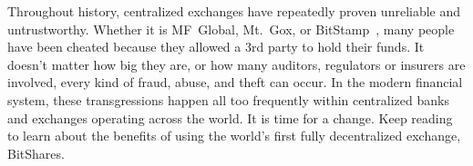 \label{sec:dex}

Throughout history, centralized exchanges have repeatedly proven unreliable and
untrustworthy. Whether it is MF~Global, Mt.~Gox, or
BitStamp~\cite{mfglobal,mtgox,bitstamp}, many people have been cheated because
they allowed a 3rd party to hold their funds. It doesn't matter how big they
are, or how many auditors, regulators or insurers are involved, every kind of
fraud, abuse, and theft can occur. In the modern financial system, these
transgressions happen all too frequently within centralized banks and exchanges
operating across the world. It is time for a change. Keep reading to learn
about the benefits of using the world's first fully decentralized exchange,
BitShares.
